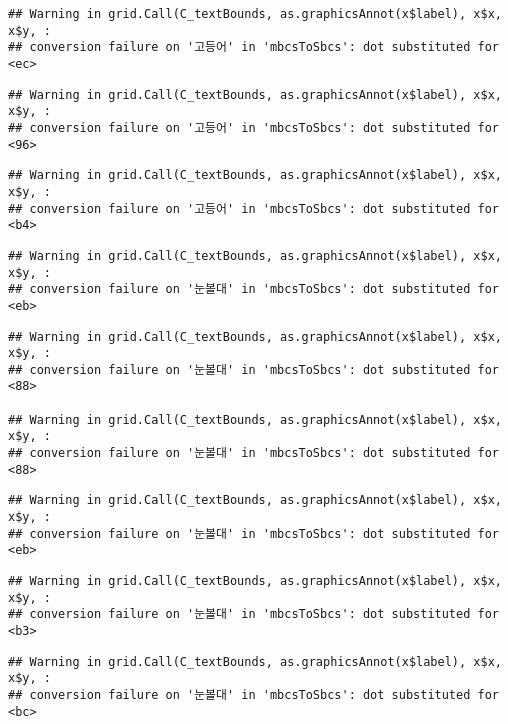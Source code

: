 \documentclass[
]{article}
\begin{document}
\begin{verbatim}
## Warning in grid.Call(C_textBounds, as.graphicsAnnot(x$label), x$x, x$y, :
## conversion failure on '고등어' in 'mbcsToSbcs': dot substituted for <ec>
\end{verbatim}

\begin{verbatim}
## Warning in grid.Call(C_textBounds, as.graphicsAnnot(x$label), x$x, x$y, :
## conversion failure on '고등어' in 'mbcsToSbcs': dot substituted for <96>
\end{verbatim}

\begin{verbatim}
## Warning in grid.Call(C_textBounds, as.graphicsAnnot(x$label), x$x, x$y, :
## conversion failure on '고등어' in 'mbcsToSbcs': dot substituted for <b4>
\end{verbatim}

\begin{verbatim}
## Warning in grid.Call(C_textBounds, as.graphicsAnnot(x$label), x$x, x$y, :
## conversion failure on '눈볼대' in 'mbcsToSbcs': dot substituted for <eb>
\end{verbatim}

\begin{verbatim}
## Warning in grid.Call(C_textBounds, as.graphicsAnnot(x$label), x$x, x$y, :
## conversion failure on '눈볼대' in 'mbcsToSbcs': dot substituted for <88>

## Warning in grid.Call(C_textBounds, as.graphicsAnnot(x$label), x$x, x$y, :
## conversion failure on '눈볼대' in 'mbcsToSbcs': dot substituted for <88>
\end{verbatim}

\begin{verbatim}
## Warning in grid.Call(C_textBounds, as.graphicsAnnot(x$label), x$x, x$y, :
## conversion failure on '눈볼대' in 'mbcsToSbcs': dot substituted for <eb>
\end{verbatim}

\begin{verbatim}
## Warning in grid.Call(C_textBounds, as.graphicsAnnot(x$label), x$x, x$y, :
## conversion failure on '눈볼대' in 'mbcsToSbcs': dot substituted for <b3>
\end{verbatim}

\begin{verbatim}
## Warning in grid.Call(C_textBounds, as.graphicsAnnot(x$label), x$x, x$y, :
## conversion failure on '눈볼대' in 'mbcsToSbcs': dot substituted for <bc>
\end{verbatim}
\end{document}
